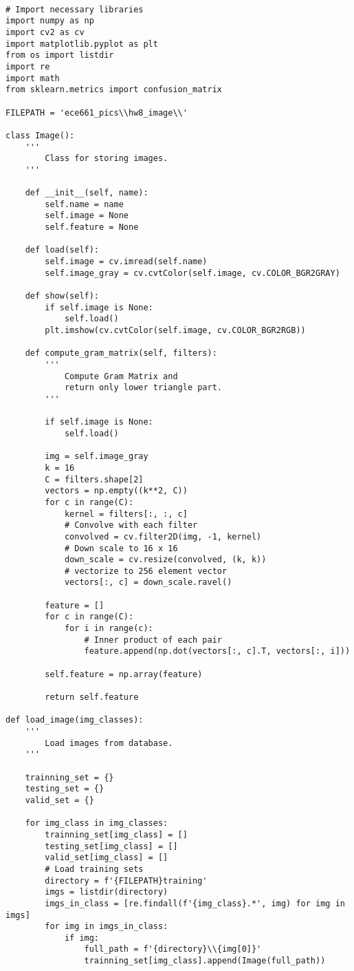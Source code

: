 \documentclass[11pt]{article}
\begin{document}
\begin{lstlisting}

# Import necessary libraries
import numpy as np
import cv2 as cv
import matplotlib.pyplot as plt
from os import listdir
import re
import math
from sklearn.metrics import confusion_matrix

FILEPATH = 'ece661_pics\\hw8_image\\'

class Image():
    ''' 
        Class for storing images.
    '''
    
    def __init__(self, name):
        self.name = name    
        self.image = None  
        self.feature = None

    def load(self):
        self.image = cv.imread(self.name)
        self.image_gray = cv.cvtColor(self.image, cv.COLOR_BGR2GRAY)

    def show(self):
        if self.image is None:
            self.load()
        plt.imshow(cv.cvtColor(self.image, cv.COLOR_BGR2RGB))

    def compute_gram_matrix(self, filters):
        ''' 
            Compute Gram Matrix and 
            return only lower triangle part.
        '''
        
        if self.image is None:
            self.load()

        img = self.image_gray
        k = 16
        C = filters.shape[2]
        vectors = np.empty((k**2, C))
        for c in range(C):
            kernel = filters[:, :, c]
            # Convolve with each filter
            convolved = cv.filter2D(img, -1, kernel)
            # Down scale to 16 x 16
            down_scale = cv.resize(convolved, (k, k))
            # vectorize to 256 element vector
            vectors[:, c] = down_scale.ravel()

        feature = []
        for c in range(C):
            for i in range(c):
                # Inner product of each pair
                feature.append(np.dot(vectors[:, c].T, vectors[:, i]))

        self.feature = np.array(feature)

        return self.feature

def load_image(img_classes):
    '''
        Load images from database.
    '''

    trainning_set = {}
    testing_set = {}
    valid_set = {}
    
    for img_class in img_classes:
        trainning_set[img_class] = []
        testing_set[img_class] = []
        valid_set[img_class] = []
        # Load training sets
        directory = f'{FILEPATH}training'
        imgs = listdir(directory)
        imgs_in_class = [re.findall(f'{img_class}.*', img) for img in imgs]
        for img in imgs_in_class:
            if img:
                full_path = f'{directory}\\{img[0]}'
                trainning_set[img_class].append(Image(full_path))


\end{lstlisting}
\end{document}
